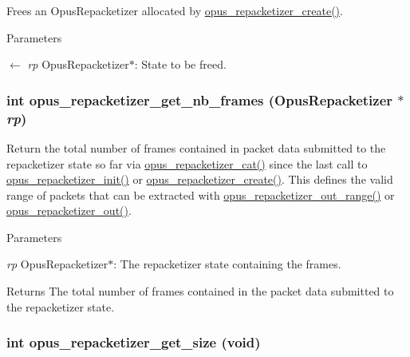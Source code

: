 Frees an {\ttfamily OpusRepacketizer} allocated by \hyperlink{group__opus__repacketizer_ga6f8813666ef851550ecf8658a731ff7d}{opus\_\-repacketizer\_\-create()}. 
\begin{DoxyParams}{Parameters}
\item[\mbox{$\leftarrow$} {\em rp}]{\ttfamily OpusRepacketizer$\ast$}: State to be freed. \end{DoxyParams}
\hypertarget{group__opus__repacketizer_ga2cad98d04458aafdf6bb9f22f34ea7c0}{
\subsubsection[{opus\_\-repacketizer\_\-get\_\-nb\_\-frames}]{\setlength{\rightskip}{0pt plus 5cm}int opus\_\-repacketizer\_\-get\_\-nb\_\-frames ({\bf OpusRepacketizer} $\ast$ {\em rp})}}
\label{group__opus__repacketizer_ga2cad98d04458aafdf6bb9f22f34ea7c0}


Return the total number of frames contained in packet data submitted to the repacketizer state so far via \hyperlink{group__opus__repacketizer_ga2840dd56bfa37f8c6874355b9ce8fb46}{opus\_\-repacketizer\_\-cat()} since the last call to \hyperlink{group__opus__repacketizer_gab42ff7c3f8a49ff5029fcf60f3b853f0}{opus\_\-repacketizer\_\-init()} or \hyperlink{group__opus__repacketizer_ga6f8813666ef851550ecf8658a731ff7d}{opus\_\-repacketizer\_\-create()}. This defines the valid range of packets that can be extracted with \hyperlink{group__opus__repacketizer_gac591b550d92125b4abfa11a4b609f51f}{opus\_\-repacketizer\_\-out\_\-range()} or \hyperlink{group__opus__repacketizer_ga19ff1e91a8fa652380f972a224a26481}{opus\_\-repacketizer\_\-out()}. 
\begin{DoxyParams}{Parameters}
\item[{\em rp}]{\ttfamily OpusRepacketizer$\ast$}: The repacketizer state containing the frames. \end{DoxyParams}
\begin{DoxyReturn}{Returns}
The total number of frames contained in the packet data submitted to the repacketizer state. 
\end{DoxyReturn}
\hypertarget{group__opus__repacketizer_ga35c8fc05764748d187c62fc50e812d06}{
\subsubsection[{opus\_\-repacketizer\_\-get\_\-size}]{\setlength{\rightskip}{0pt plus 5cm}int opus\_\-repacketizer\_\-get\_\-size (void)}}
\label{group__opus__repacketizer_ga35c8fc05764748d187c62fc50e812d06}


